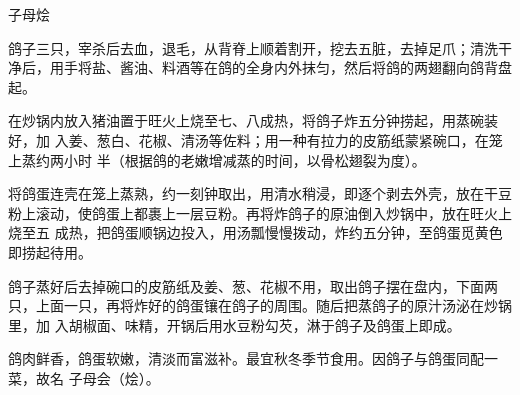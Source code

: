 \begin{recipe}{子母烩}

\ingredients


\preparation

\step 鸽子三只，宰杀后去血，退毛，从背脊上顺着割开，挖去五脏，去掉足爪；清洗干
净后，用手将盐、酱油、料酒等在鸽的全身内外抹匀，然后将鸽的两翅翻向鸽背盘起。

在炒锅内放入猪油置于旺火上烧至七、八成热，将鸽子炸五分钟捞起，用蒸碗装好，加
入姜、葱白、花椒、清汤等佐料；用一种有拉力的皮筋纸蒙紧碗口，在笼上蒸约两小时
半（根据鸽的老嫩增减蒸的时间，以骨松翅裂为度）。

\step 将鸽蛋连壳在笼上蒸熟，约一刻钟取出，用清水稍浸，即逐个剥去外壳，放在干豆
粉上滚动，使鸽蛋上都裹上一层豆粉。再将炸鸽子的原油倒入炒锅中，放在旺火上烧至五
成热，把鸽蛋顺锅边投入，用汤瓢慢慢拨动，炸约五分钟，至鸽蛋觅黄色即捞起待用。

\step 鸽子蒸好后去掉碗口的皮筋纸及姜、葱、花椒不用，取出鸽子摆在盘内，下面两
只，上面一只，再将炸好的鸽蛋镶在鸽子的周围。随后把蒸鸽子的原汁汤泌在炒锅里，加
入胡椒面、味精，开锅后用水豆粉勾芡，淋于鸽子及鸽蛋上即成。

\features

鸽肉鲜香，鸽蛋软嫩，清淡而富滋补。最宜秋冬季节食用。因鸽子与鸽蛋同配一菜，故名
子母会（烩）。

\end{recipe}

